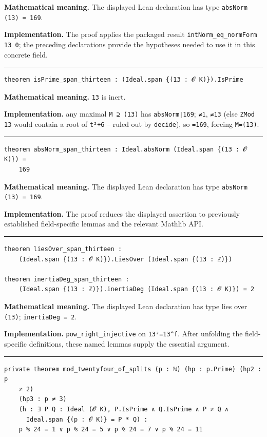 \documentclass[UTF8,a4paper,11pt,fontset=fandol]{ctexart}
\theoremstyle{definition}
\newcommand{\statementsep}{\par\medskip\hrule\medskip}
\begin{document}
\noindent\textbf{Mathematical meaning.} The displayed Lean declaration has type \texttt{absNorm (13) = 169}.\par
\noindent\textbf{Implementation.} The proof applies the packaged result \texttt{intNorm\_\allowbreak{}eq\_\allowbreak{}normForm 13 0}; the preceding declarations provide the hypotheses needed to use it in this concrete field.\par
\statementsep
\begin{verbatim}
theorem isPrime_span_thirteen : (Ideal.span {(13 : 𝓞 K)}).IsPrime
\end{verbatim}
\noindent\textbf{Mathematical meaning.} \texttt{13} is inert.\par
\noindent\textbf{Implementation.} any maximal \texttt{M ⊇ (13)} has \texttt{absNorm∣169}; \texttt{≠1}, \texttt{≠13} (else \texttt{ZMod 13} would contain a root of \texttt{t²+6} -- ruled out by \texttt{decide}), so \texttt{=169}, forcing \texttt{M=(13)}.\par
\statementsep
\begin{verbatim}
theorem absNorm_span_thirteen : Ideal.absNorm (Ideal.span {(13 : 𝓞 K)}) =
    169
\end{verbatim}
\noindent\textbf{Mathematical meaning.} The displayed Lean declaration has type \texttt{absNorm (13) = 169}.\par
\noindent\textbf{Implementation.} The proof reduces the displayed assertion to previously established field-specific lemmas and the relevant Mathlib API.\par
\statementsep
\begin{verbatim}
theorem liesOver_span_thirteen :
    (Ideal.span {(13 : 𝓞 K)}).LiesOver (Ideal.span {(13 : ℤ)})

theorem inertiaDeg_span_thirteen :
    (Ideal.span {(13 : ℤ)}).inertiaDeg (Ideal.span {(13 : 𝓞 K)}) = 2
\end{verbatim}
\noindent\textbf{Mathematical meaning.} The displayed Lean declaration has type lies over \texttt{(13)}; \texttt{inertiaDeg = 2}.\par
\noindent\textbf{Implementation.} \texttt{pow\_\allowbreak{}right\_\allowbreak{}injective} on \texttt{13²=13\textasciicircum{}f}. After unfolding the field-specific definitions, these named lemmas supply the essential argument.\par
\statementsep
\begin{verbatim}
private theorem mod_twentyfour_of_splits (p : ℕ) (hp : p.Prime) (hp2 : p
    ≠ 2)
    (hp3 : p ≠ 3)
    (h : ∃ P Q : Ideal (𝓞 K), P.IsPrime ∧ Q.IsPrime ∧ P ≠ Q ∧
      Ideal.span {(p : 𝓞 K)} = P * Q) :
    p % 24 = 1 ∨ p % 24 = 5 ∨ p % 24 = 7 ∨ p % 24 = 11
\end{verbatim}
\end{document}
